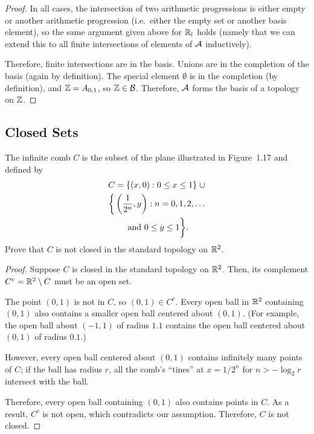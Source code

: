 \documentclass[twocolumn, noxcolor, maketitle]{rbt-mathnotes-hw}
\def\basis{\mathcal{B}}
\begin{document}
\begin{proof}
  In all cases, the intersection of two arithmetic progressions is either empty or
  another arithmetic progression (i.e.~either the empty set or another basis
  element), so the same argument given above for $\mathbb{R}_l$ holds (namely that we can
  extend this to all finite intersections of elements of $\mathcal{A}$ inductively).

  Therefore, finite intersections are in the basis. Unions are in the completion
  of the basis (again by definition). The special element $\emptyset$ is in the
  completion (by definition), and $\mathbb{Z} = A_{0,1}$, so $\Z \in \basis$. Therefore,
  $\mathcal{A}$ forms the basis of a topology on $\mathbb{Z}$.
\end{proof}

\pagebreak
\subsection{Closed Sets}
\begin{problem}[1.27(a)]
  The infinite comb $C$ is the subset of the plane illustrated in Figure~1.17
  and defined by
  \begin{multline*}
    C = \{(x,0) : 0 \le x \le 1\} \;\cup \\
    \bigg\{ \left( \frac{1}{2^n}, y \right) : n = 0,1,2, \dots \\
      \text{ and } 0 \le y \le 1 \bigg\}.   
  \end{multline*}
  Prove that $C$ is not closed in the standard topology on $\mathbb{R}^2$.
\end{problem}
\begin{proof}
  Suppose $C$ is closed in the standard topology on $\mathbb{R}^2$. Then, its complement
  $C^c = \mathbb{R}^2 \setminus C$ must be an open set.

  The point $(0, 1)$ is not in $C$, so $(0, 1) \in C^c$. Every open ball in $\mathbb{R}^2$
  containing $(0, 1)$ also contains a smaller open ball centered about $(0, 1)$.
  (For example, the open ball about $(-1, 1)$ of radius $1.1$ contains the open
  ball centered about $(0, 1)$ of radius $0.1$.)

  However, every open ball centered about $(0, 1)$ contains infinitely many
  points of $C$; if the ball has radius $r$, all the comb's ``tines'' at $x =
  1/2^n$ for $n > - \log_2 r$ intersect with the ball.

  Therefore, every open ball containing $(0, 1)$ also contains points in $C$. As
  a result, $C^c$ is not open, which contradicts our assumption. Therefore, $C$
  is not closed.
\end{proof}
\end{document}
